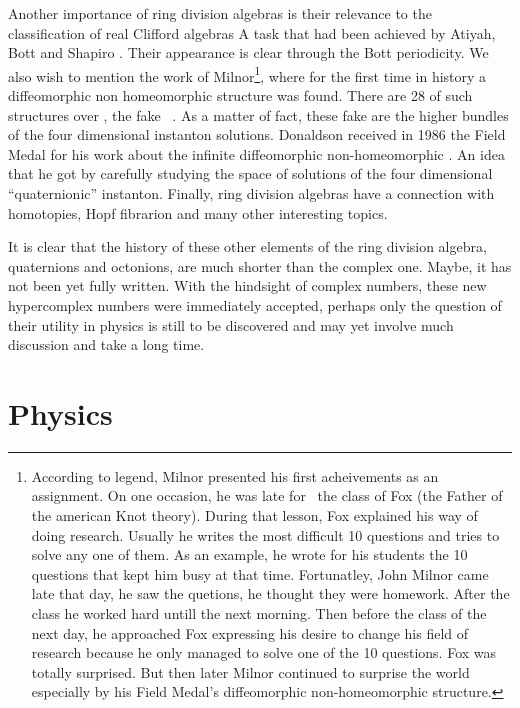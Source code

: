 \documentclass[a4paper,12pt]{book}
\begin{document}
Another importance of ring division algebras is their relevance to the
classification of real Clifford algebras \coordHE{} A task
that had been achieved by Atiyah, Bott and Shapiro \cite{abs}. Their
appearance is clear through the Bott periodicity. We also wish to mention
the work of Milnor\footnote{%
According to legend, Milnor presented his first acheivements as an
assignment. On one occasion, he was late for \ the class of Fox (the Father
of the american Knot theory). During that lesson, Fox explained his way of
doing research. Usually he writes the most difficult 10 questions and tries
to solve any one of them. As an example, he wrote for his students the 10
questions that kept him busy at that time. Fortunatley, John Milnor came
late that day, he saw the quetions, he thought they were homework. After the
class he worked hard untill the next morning. Then before the class of the
next day, he approached Fox expressing his desire to change his field of
research because he only managed to solve one of the 10 questions. Fox was
totally surprised. But then later Milnor continued to surprise the world
especially by his Field Medal's diffeomorphic non-homeomorphic structure.},
where for the first time in history a diffeomorphic non homeomorphic
structure was found. There are 28 of such structures over \coordHE{}, the fake \coordHE{} \ \cite{milnor}. As a matter of fact, these fake \coordHE{} are the
higher bundles of the four dimensional \coordHE{} instanton
solutions\cite{yoniama}. Donaldson received in 1986 the Field Medal for his
work about the infinite diffeomorphic non-homeomorphic \coordHE{}. An
idea that he got by carefully studying the space of solutions of the four
dimensional \coordHE{} ``quaternionic'' instanton. Finally, ring division
algebras have a connection with homotopies, Hopf fibrarion and many other
interesting topics.

It is clear that the history of these other elements of the ring division
algebra, quaternions and octonions, are much shorter than the complex one.
Maybe, it has not been yet fully written. With the hindsight of complex
numbers, these new hypercomplex numbers were immediately accepted, perhaps
only the question of their utility in physics is still to be discovered and
may yet involve much discussion and take a long time.

\section{Physics}
\end{document}
